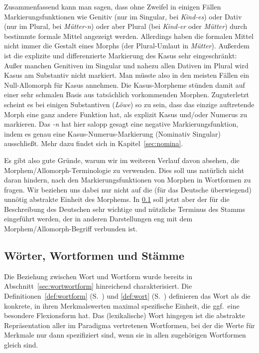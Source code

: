 Zusammenfassend kann man sagen, dass ohne Zweifel in einigen Fällen Markierungsfunktionen wie Genitiv (nur im Singular, \zB bei \textit{Kind-es}) oder Dativ (nur im Plural, \zB bei \textit{Mütter-n}) oder aber Plural (\zB bei \textit{Kind-er} oder \textit{Mütter}) durch bestimmte formale Mittel angezeigt werden.
Allerdings haben die formalen Mittel nicht immer die Gestalt eines Morphs (\zB der Plural-Umlaut in \textit{Mütter}).
Außerdem ist die explizite und differenzierte Markierung des Kasus sehr eingeschränkt:
Außer manchen Genitiven im Singular und nahezu allen Dativen im Plural wird Kasus am Substantiv nicht markiert.
Man müsste also in den meisten Fällen ein Null-Allomorph für Kasus annehmen.
Die Kasus-Morpheme stünden damit auf einer sehr schmalen Basis aus tatsächlich vorkommenden Morphen.
Zuguterletzt scheint es bei einigen Substantiven (\zB \textit{Löwe}) so zu sein, dass das einzige auftretende Morph eine ganz andere Funktion hat, als explizit Kasus und\slash oder Numerus zu markieren.
Das \textit{-n} hat hier salopp gesagt eine negative Markierungsfunktion, indem es genau eine Kasus-Numerus-Markierung (Nominativ Singular) ausschließt.
Mehr dazu findet sich in Kapitel~\ref{sec:nomina}.

Es gibt also gute Gründe, warum wir im weiteren Verlauf davon absehen, die Morphem\slash Allomorph-Terminologie zu verwenden.
Dies soll uns natürlich nicht daran hindern, nach den Markierungsfunktionen von Morphen in Wortformen zu fragen.
Wir beziehen uns dabei nur nicht auf die (für das Deutsche überwiegend) unnötig abstrakte Einheit des Morphems.
In \ref{sec:stamm} soll jetzt aber der für die Beschreibung des Deutschen sehr wichtige und nützliche Terminus des Stamms eingeführt werden, der in anderen Darstellungen eng mit dem Morphem\slash Allomorph-Begriff verbunden ist.

\subsection{Wörter, Wortformen und Stämme}

\label{sec:stamm}


Die Beziehung zwischen Wort und Wortform wurde bereits in Abschnitt~\ref{sec:wortwortform} hinreichend charakterisiert.
Die Definitionen~\ref{def:wortform} (S.~\pageref{def:wortform}) und \ref{def:wort} (S.~\pageref{def:wort}) definieren das Wort als die konkrete, in ihren Merkmalswerten maximal spezifische Einheit, die ggf.\ eine besondere Flexionsform hat.
Das (lexikalische) Wort hingegen ist die abstrakte Repräsentation aller im Paradigma vertretenen Wortformen, bei der die Werte für Merkmale nur dann spezifiziert sind, wenn sie in allen zugehörigen Wortformen gleich sind.

